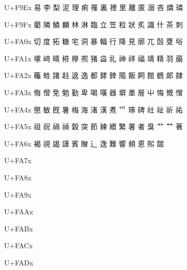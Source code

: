 U+F9Ex	易	李	梨	泥	理	痢	罹	裏	裡	里	離	匿	溺	吝	燐	璘

U+F9Fx	藺	隣	鱗	麟	林	淋	臨	立	笠	粒	狀	炙	識	什	茶	刺

U+FA0x	切	度	拓	糖	宅	洞	暴	輻	行	降	見	廓	兀	嗀	﨎	﨏

U+FA1x	塚	﨑	晴	﨓	﨔	凞	猪	益	礼	神	祥	福	靖	精	羽	﨟

U+FA2x	蘒	﨡	諸	﨣	﨤	逸	都	﨧	﨨	﨩	飯	飼	館	鶴	郞	隷

U+FA3x	侮	僧	免	勉	勤	卑	喝	嘆	器	塀	墨	層	屮	悔	慨	憎

U+FA4x	懲	敏	既	暑	梅	海	渚	漢	煮	爫	琢	碑	社	祉	祈	祐

U+FA5x	祖	祝	禍	禎	穀	突	節	練	縉	繁	署	者	臭	艹	艹	著

U+FA6x	褐	視	謁	謹	賓	贈	辶	逸	難	響	頻	恵	𤋮	舘		

U+FA7x	並	况	全	侀	充	冀	勇	勺	喝	啕	喙	嗢	塚	墳	奄	奔

U+FA8x	婢	嬨	廒	廙	彩	徭	惘	慎	愈	憎	慠	懲	戴	揄	搜	摒

U+FA9x	敖	晴	朗	望	杖	歹	殺	流	滛	滋	漢	瀞	煮	瞧	爵	犯

U+FAAx	猪	瑱	甆	画	瘝	瘟	益	盛	直	睊	着	磌	窱	節	类	絛

U+FABx	練	缾	者	荒	華	蝹	襁	覆	視	調	諸	請	謁	諾	諭	謹

U+FACx	變	贈	輸	遲	醙	鉶	陼	難	靖	韛	響	頋	頻	鬒	龜	𢡊

U+FADx	𢡄	𣏕	㮝	䀘	䀹	𥉉	𥳐	𧻓	齃	龎

